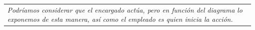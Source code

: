     \begin{table}[H]
        \begin{tabular}{|l|}
        \hline
        \rowcolor[HTML]{E6E6E6} 
        \multicolumn{1}{|c|}{\textbf{Comentarios}} \\ \hline
        \multicolumn{1}{|p{15cm}|}{{\color[HTML]{808080} \textit{Podríamos considerar que el encargado actúa, pero en función del diagrama lo exponemos de esta manera, así como el empleado es quien inicia la acción.}}} \\ \hline
        \end{tabular}
    \end{table}





    
